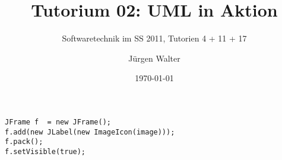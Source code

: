


\title[Tutorium01]{Tutorium 02: UML in Aktion}
\subtitle{Softwaretechnik im SS 2011, Tutorien 4 + 11 + 17}
\author{Jürgen Walter}
\date{\today}




\begin{lstlisting}
JFrame f  = new JFrame();
f.add(new JLabel(new ImageIcon(image)));
f.pack();
f.setVisible(true);
\end{lstlisting}

